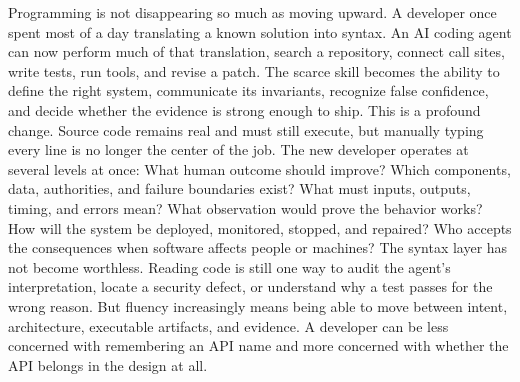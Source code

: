 {}Programming is not disappearing so much as moving upward. A developer once\markdownRendererSoftLineBreak
{}spent most of a day translating a known solution into syntax. An AI coding\markdownRendererSoftLineBreak
{}agent can now perform much of that translation, search a repository, connect\markdownRendererSoftLineBreak
{}call sites, write tests, run tools, and revise a patch. The scarce skill becomes\markdownRendererSoftLineBreak
{}the ability to define the right system, communicate its invariants, recognize\markdownRendererSoftLineBreak
{}false confidence, and decide whether the evidence is strong enough to ship.\markdownRendererParagraphSeparator
{}This is a profound change. Source code remains real and must still execute, but\markdownRendererSoftLineBreak
{}manually typing every line is no longer the center of the job. The new\markdownRendererSoftLineBreak
{}developer operates at several levels at once:\markdownRendererInterblockSeparator
{}\markdownRendererUlBegin
\markdownRendererUlItem {} What human outcome should improve?\markdownRendererUlItemEnd 
\markdownRendererUlItem {} Which components, data, authorities, and failure boundaries exist?\markdownRendererUlItemEnd 
\markdownRendererUlItem {} What must inputs, outputs, timing, and errors mean?\markdownRendererUlItemEnd 
\markdownRendererUlItem {} What observation would prove the behavior works?\markdownRendererUlItemEnd 
\markdownRendererUlItem {} How will the system be deployed, monitored, stopped, and repaired?\markdownRendererUlItemEnd 
\markdownRendererUlItem {} Who accepts the consequences when software affects people or machines?\markdownRendererUlItemEnd 
\markdownRendererUlEnd \markdownRendererInterblockSeparator
{}The syntax layer has not become worthless. Reading code is still one way to\markdownRendererSoftLineBreak
{}audit the agent's interpretation, locate a security defect, or understand why\markdownRendererSoftLineBreak
{}a test passes for the wrong reason. But fluency increasingly means being able\markdownRendererSoftLineBreak
{}to move between intent, architecture, executable artifacts, and evidence. A\markdownRendererSoftLineBreak
{}developer can be less concerned with remembering an API name and more\markdownRendererSoftLineBreak
{}concerned with whether the API belongs in the design at all.\markdownRendererInterblockSeparator
{}\markdownRendererSectionBegin
